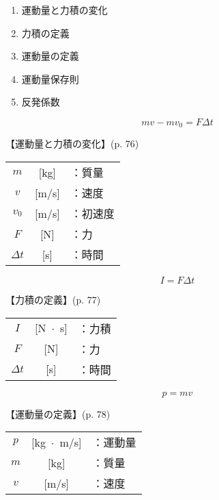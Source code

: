 \documentclass[10pt]{jarticle}
\begin{document}
\begin{enumerate}
\setcounter{enumi}{\thepage}
\small
\itemsep-4mm
\item 運動量と力積の変化\\
\item 力積の定義\\
\item 運動量の定義\\
\item 運動量保存則\\
\item 反発係数
\end{enumerate}




\newpage
\[
	mv - mv_0 = F \mathit{\Delta}t
\]


\vskip3mm
【運動量と力積の変化】{\footnotesize (p. 76)}

\begin{tabular}{ccl}
$m$	&[kg]	&：質量\\
$v$	&[m/s]	&：速度\\
$v_0$	&[m/s]	&：初速度\\
$F$	&[N]	&：力\\
$\mathit{\Delta}t$	&[s]	&：時間
\end{tabular}






\newpage
\[
	I = F \mathit{\Delta}t
\]


\vskip3mm
【力積の定義】{\footnotesize (p. 77)}

\begin{tabular}{ccl}
$I$	&[N $\!\! \cdot \!\!$ s]	&：力積\\
$F$	&[N]	&：力\\
$\mathit{\Delta}t$	&[s]	&：時間
\end{tabular}





\newpage
\[
	p = mv
\]


\vskip3mm
【運動量の定義】{\footnotesize (p. 78)}

\begin{tabular}{ccl}
$p$	&[kg $\!\! \cdot \!\!$ m/s]	&：運動量\\
$m$	&[kg]	&：質量\\
$v$	&[m/s]	&：速度
\end{tabular}
\end{document}
